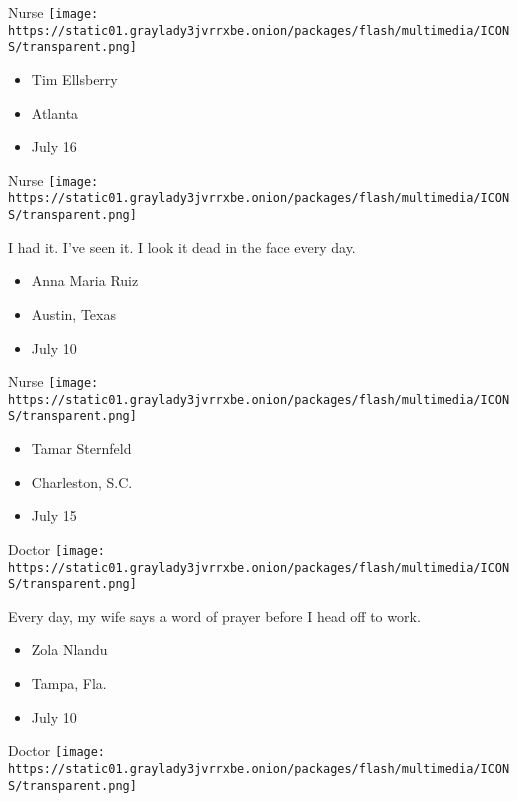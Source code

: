 \protect\hyperlink{item-tim-ellsberry}{}

Nurse
\texttt{[image: https://static01.graylady3jvrrxbe.onion/packages/flash/multimedia/ICONS/transparent.png]}

\begin{itemize}
\tightlist
\item
  Tim Ellsberry
\item
  Atlanta
\item
  July 16
\end{itemize}

\protect\hyperlink{item-anna-maria-ruiz}{}

Nurse
\texttt{[image: https://static01.graylady3jvrrxbe.onion/packages/flash/multimedia/ICONS/transparent.png]}

I had it. I've seen it. I look it dead in the face every day.

\begin{itemize}
\tightlist
\item
  Anna Maria Ruiz
\item
  Austin, Texas
\item
  July 10
\end{itemize}

\protect\hyperlink{item-tamar-sternfeld}{}

Nurse
\texttt{[image: https://static01.graylady3jvrrxbe.onion/packages/flash/multimedia/ICONS/transparent.png]}

\begin{itemize}
\tightlist
\item
  Tamar Sternfeld
\item
  Charleston, S.C.
\item
  July 15
\end{itemize}

\protect\hyperlink{item-zola-nlandu}{}

Doctor
\texttt{[image: https://static01.graylady3jvrrxbe.onion/packages/flash/multimedia/ICONS/transparent.png]}

Every day, my wife says a word of prayer before I head off to work.

\begin{itemize}
\tightlist
\item
  Zola Nlandu
\item
  Tampa, Fla.
\item
  July 10
\end{itemize}

\protect\hyperlink{item-jesse-hart}{}

Doctor
\texttt{[image: https://static01.graylady3jvrrxbe.onion/packages/flash/multimedia/ICONS/transparent.png]}

